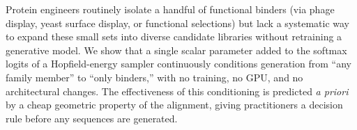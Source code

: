 
Protein engineers routinely isolate a handful of functional binders (via phage display, yeast
surface display, or functional selections) but lack a systematic way to expand these small sets
into diverse candidate libraries without retraining a generative model. We show that a single
scalar parameter added to the softmax logits of a Hopfield-energy sampler continuously conditions
generation from ``any family member'' to ``only binders,'' with no training, no GPU, and no
architectural changes. The effectiveness of this conditioning is predicted \emph{a priori} by a
cheap geometric property of the alignment, giving practitioners a decision rule before any
sequences are generated.
